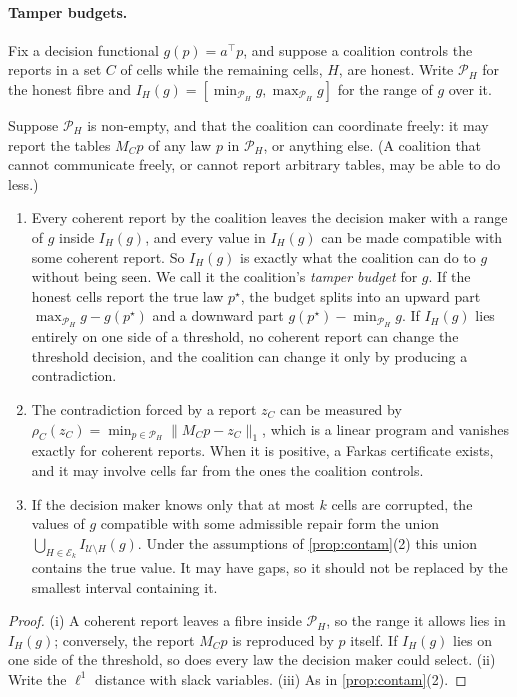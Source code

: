 \documentclass[11pt]{article}
\theoremstyle{definition}\newtheorem{definition}[theorem]{Definition}\newtheorem{remark}[theorem]{Remark}\newtheorem{example}[theorem]{Example}\newtheorem{problem}[theorem]{Open problem}\crefname{problem}{Problem}{Problems}
\begin{document}
\paragraph{Tamper budgets.} Fix a decision functional $g(p)=a^\top p$, and suppose a coalition controls the reports in a set $C$ of cells while the remaining cells, $H$, are honest. Write $\mathcal P_H$ for the honest fibre and $I_H(g)=[\min_{\mathcal P_H}g,\max_{\mathcal P_H}g]$ for the range of $g$ over it.

\begin{proposition}\label{prop:tamper}
Suppose $\mathcal P_H$ is non-empty, and that the coalition can coordinate freely: it may report the tables $M_Cp$ of any law $p$ in $\mathcal P_H$, or anything else. (A coalition that cannot communicate freely, or cannot report arbitrary tables, may be able to do less.)
\begin{enumerate}
\item[(i)] Every coherent report by the coalition leaves the decision maker with a range of $g$ inside $I_H(g)$, and every value in $I_H(g)$ can be made compatible with some coherent report. So $I_H(g)$ is exactly what the coalition can do to $g$ without being seen. We call it the coalition's \emph{tamper budget} for $g$. If the honest cells report the true law $p^\star$, the budget splits into an upward part $\max_{\mathcal P_H}g-g(p^\star)$ and a downward part $g(p^\star)-\min_{\mathcal P_H}g$. If $I_H(g)$ lies entirely on one side of a threshold, no coherent report can change the threshold decision, and the coalition can change it only by producing a contradiction.
\item[(ii)] The contradiction forced by a report $z_C$ can be measured by $\rho_C(z_C)=\min_{p\in\mathcal P_H}\lVert M_Cp-z_C\rVert_1$, which is a linear program and vanishes exactly for coherent reports. When it is positive, a Farkas certificate exists, and it may involve cells far from the ones the coalition controls.
\item[(iii)] If the decision maker knows only that at most $k$ cells are corrupted, the values of $g$ compatible with some admissible repair form the union $\bigcup_{H\in\mathcal E_k}I_{\mathcal U\setminus H}(g)$. Under the assumptions of \cref{prop:contam}(2) this union contains the true value. It may have gaps, so it should not be replaced by the smallest interval containing it.
\end{enumerate}
\end{proposition}

\begin{proof}
(i) A coherent report leaves a fibre inside $\mathcal P_H$, so the range it allows lies in $I_H(g)$; conversely, the report $M_Cp$ is reproduced by $p$ itself. If $I_H(g)$ lies on one side of the threshold, so does every law the decision maker could select. (ii) Write the $\ell^1$ distance with slack variables. (iii) As in \cref{prop:contam}(2).
\end{proof}
\end{document}
